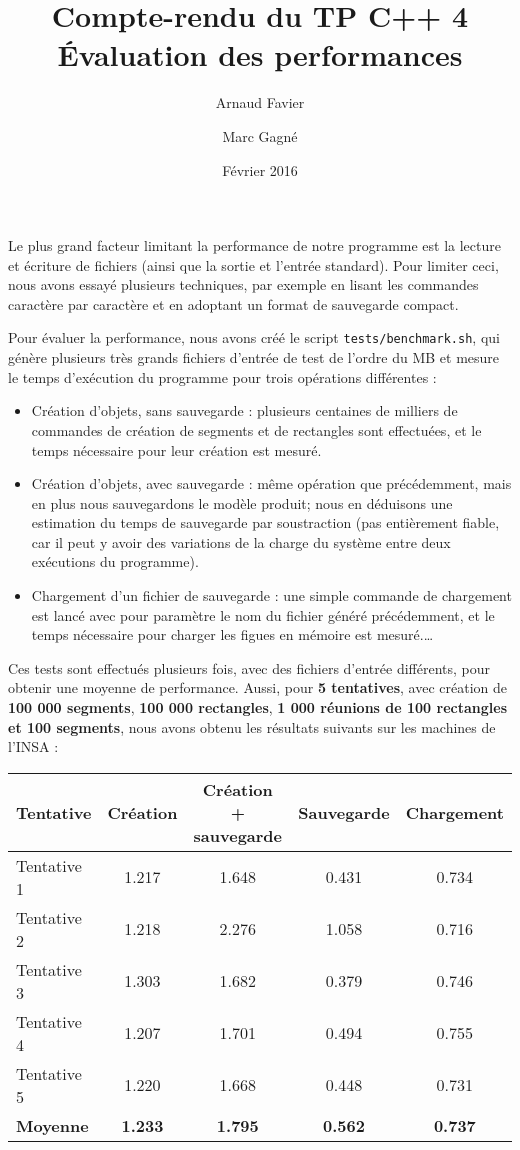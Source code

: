 \documentclass[11pt,a4paper]{article}
\begin{document}
	
	\title{
		Compte-rendu du TP C++ 4\\
		Évaluation des performances
	}
	\author{
		Arnaud Favier\\
		\and
		Marc Gagné
	}
	\date{Février 2016}
	\maketitle
	
	Le plus grand facteur limitant la performance de notre programme est la lecture et écriture de fichiers (ainsi que la sortie et l'entrée standard). Pour limiter ceci, nous avons essayé plusieurs techniques, par exemple en lisant les commandes caractère par caractère et en adoptant un format de sauvegarde compact.
	
	Pour évaluer la performance, nous avons créé le script \texttt{tests/benchmark.sh}, qui génère plusieurs très grands fichiers d'entrée de test de l'ordre du MB et mesure le temps d'exécution du programme pour trois opérations différentes :
	\begin{itemize}
		\item Création d'objets, sans sauvegarde : plusieurs centaines de milliers de commandes de création de segments et de rectangles sont effectuées, et le temps nécessaire pour leur création est mesuré.
		\item Création d'objets, avec sauvegarde : même opération que précédemment, mais en plus nous sauvegardons le modèle produit; nous en déduisons une estimation du temps de sauvegarde par soustraction (pas entièrement fiable, car il peut y avoir des variations de la charge du système entre deux exécutions du programme).
		\item Chargement d'un fichier de sauvegarde : une simple commande de chargement est lancé avec pour paramètre le nom du fichier généré précédemment, et le temps nécessaire pour charger les figues en mémoire est mesuré.\ldots
	\end{itemize}
	Ces tests sont effectués plusieurs fois, avec des fichiers d'entrée différents, pour obtenir une moyenne de performance. Aussi, pour \textbf{5 tentatives}, avec création de \textbf{100 000 segments}, \textbf{100 000 rectangles}, \textbf{1 000 réunions de 100 rectangles et 100 segments}, nous avons obtenu les résultats suivants sur les machines de l'INSA :

		\begin{center}
			\begin{tabular}[c]{l | c c c c}
			Tentative & Création & Création + sauvegarde & Sauvegarde & Chargement \\
			\hline
			Tentative 1 & 1.217 & 1.648 & 0.431 & 0.734 \\
			Tentative 2 & 1.218 & 2.276 & 1.058 & 0.716 \\
			Tentative 3 & 1.303 & 1.682 & 0.379 & 0.746 \\
			Tentative 4 & 1.207 & 1.701 & 0.494 & 0.755 \\
			Tentative 5 & 1.220 & 1.668 & 0.448 & 0.731 \\
			\hline
			\textbf{Moyenne} & \textbf{1.233} & \textbf{1.795} & \textbf{0.562} & \textbf{0.737}
		\end{tabular}
	\end{center}
	
\end{document}
